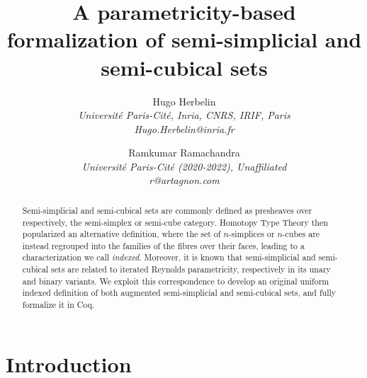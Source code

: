 \documentclass{art.cls/art}
\begin{document}
\title{A parametricity-based formalization of semi-simplicial and semi-cubical sets}
\date{}
\author{
  \textcolor{gray80}{Hugo Herbelin} \\
  \itshape \textcolor{gray80}{Université Paris-Cité, Inria, CNRS, IRIF, Paris} \\
  \ttfamily \textcolor{gray80}{Hugo.Herbelin@inria.fr}
  \and
  \textcolor{gray80}{Ramkumar Ramachandra} \\
  \itshape \textcolor{gray80}{Université Paris-Cité (2020-2022), Unaffiliated} \\
  \ttfamily \textcolor{gray80}{r@artagnon.com}
}
\maketitle
\begin{abstract}
  Semi-simplicial and semi-cubical sets are commonly defined as presheaves over respectively, the semi-simplex or semi-cube category. Homotopy Type Theory then popularized an alternative definition, where the set of $n$-simplices or $n$-cubes are instead regrouped into the families of the fibres over their faces, leading to a characterization we call \emph{indexed}. Moreover, it is known that semi-simplicial and semi-cubical sets are related to iterated Reynolds parametricity, respectively in its unary and binary variants. We exploit this correspondence to develop an original uniform indexed definition of both augmented semi-simplicial and semi-cubical sets, and fully formalize it in Coq.
\end{abstract}

\section{Introduction}
\end{document}
